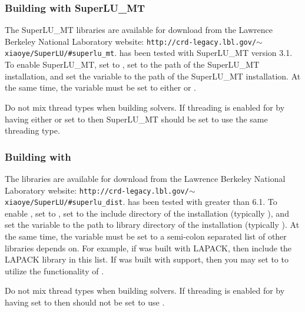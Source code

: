 \subsubsection*{Building with SuperLU\_MT}
The SuperLU\_MT libraries are available for download from the Lawrence Berkeley National Laboratory website:
{\tt http://crd-legacy.lbl.gov/$\sim$xiaoye/SuperLU/\#superlu\_mt}.
{\sundials} has been tested with SuperLU\_MT version 3.1.
To enable SuperLU\_MT, set   to , set 
to the  path of the SuperLU\_MT installation, and set the variable
\newline{} to the  path of the SuperLU\_MT installation.
At the same time, the variable
 must be set to either  or \id{{\openmp}}.

\noindent Do not mix thread types when building {\sundials} solvers.
If threading is enabled for {\sundials} by having either  or  set to 
then SuperLU\_MT should be set to use the same threading type.{\warn}

\subsubsection*{Building with {\superludist}}
The {\superludist} libraries are available for download from the Lawrence Berkeley National Laboratory website:
{\tt http://crd-legacy.lbl.gov/$\sim$xiaoye/SuperLU/\#superlu\_dist}.
{\sundials} has been tested with {\superludist} greater than 6.1.
To enable {\superludist}, set  to , set 
to the include directory of the {\superludist} installation (typically ), and set the variable
\newline{} to the path to library directory of the {\superludist} installation (typically ). At the same time, the variable
 must be set to a semi-colon separated list of
other libraries {\superludist} depends on. For example, if {\superludist} was
built with LAPACK, then include the LAPACK library in this list.
If {\superludist} was built with {\openmp} support, then you may set 
to  to utilize the {\openmp} functionality of {\superludist}.

\noindent Do not mix thread types when building {\sundials} solvers.
If threading is enabled for {\sundials} by having  set to 
then {\superludist} should not be set to use {\openmp}.{\warn}

